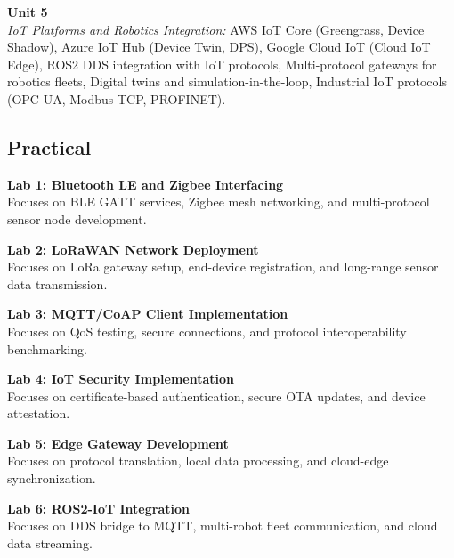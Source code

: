 \vspace{0.3cm}

\noindent\textbf{Unit 5} \\
\textit{IoT Platforms and Robotics Integration:} AWS IoT Core (Greengrass, Device Shadow), Azure IoT Hub (Device Twin, DPS), Google Cloud IoT (Cloud IoT Edge), ROS2 DDS integration with IoT protocols, Multi-protocol gateways for robotics fleets, Digital twins and simulation-in-the-loop, Industrial IoT protocols (OPC UA, Modbus TCP, PROFINET).

\newpage

\subsection*{Practical}
\noindent\textbf{Lab 1: Bluetooth LE and Zigbee Interfacing} \\
Focuses on BLE GATT services, Zigbee mesh networking, and multi-protocol sensor node development.

\vspace{0.2cm}

\noindent\textbf{Lab 2: LoRaWAN Network Deployment} \\
Focuses on LoRa gateway setup, end-device registration, and long-range sensor data transmission.

\vspace{0.2cm}

\noindent\textbf{Lab 3: MQTT/CoAP Client Implementation} \\
Focuses on QoS testing, secure connections, and protocol interoperability benchmarking.

\vspace{0.2cm}

\noindent\textbf{Lab 4: IoT Security Implementation} \\
Focuses on certificate-based authentication, secure OTA updates, and device attestation.

\vspace{0.2cm}

\noindent\textbf{Lab 5: Edge Gateway Development} \\
Focuses on protocol translation, local data processing, and cloud-edge synchronization.

\vspace{0.2cm}

\noindent\textbf{Lab 6: ROS2-IoT Integration} \\
Focuses on DDS bridge to MQTT, multi-robot fleet communication, and cloud data streaming.

